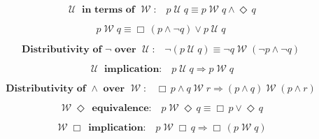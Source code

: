 \documentclass[12pt, fleqn, leqno]{article}
\newcommand{\impl}{\ensuremath{\Rightarrow}}        %
\newcommand{\Until}{\;\mathcal{U}\;}
\newcommand{\Wait}{\;\mathcal{W}\;}
\newcommand{\Event}{\Diamond\,}
\newcommand{\Always}{\Box\,}
\newcommand{\spacer}{\vspace{-30pt}}
\begin{document}
\spacer

\begin{equation}\label{E:untilFromWait}
\textbf{$\Until$ in terms of $\Wait$:}\quad p \Until q \equiv p \Wait q\land \Event q
\end{equation}

\spacer

\begin{equation}\label{E:EmersonEquiv}
p \Wait q  \equiv \Always (p \land \neg q) \lor p \Until q
\end{equation}

\spacer

\begin{equation}\label{E:notUntil}
\textbf{Distributivity of $\neg$ over $\Until$:}\quad \neg (p \Until q) \equiv \neg q \Wait (\neg p \land \neg q)
\end{equation}

\spacer

\begin{equation}\label{E:untilImplWait}
\textbf{$\Until$ implication:}\quad p\Until q\impl p\Wait q
\end{equation}

\spacer

\begin{equation}\label{E:andWaitDist}
\textbf{Distributivity of $\land$ over $\Wait$:}\quad \Always p \land q \Wait r \impl (p \land q) \Wait (p \land r)
\end{equation}

\spacer

\begin{equation}\label{E:EventWaitequiv}
\textbf{$\Wait\Event$ equivalence:}\quad p\Wait\Event q \equiv \Always p \lor \Event q
\end{equation}

\spacer

\begin{equation}\label{E:alwaysWaitImpl}
\textbf{$\Wait\Always$ implication:}\quad p\Wait\Always q \impl\Always (p \Wait q)
\end{equation}

\spacer
\end{document}
